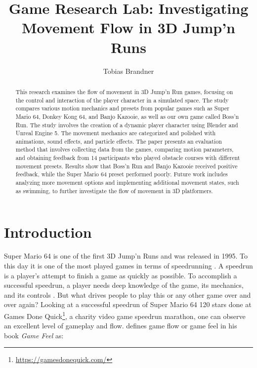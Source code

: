 \documentclass[letterpaper, 10 pt, conference]{ieeeconf}  %
\title{\LARGE \bf
Game Research Lab: Investigating Movement Flow in 3D Jump'n Runs
}
\author{Tobias Brandner}
\affil{Julius-Maximilians University \\
        Würzburg, Germany \\
        tobias.brandner@stud-mail.uni-wuerzburg.de}
\begin{document}
\maketitle
\thispagestyle{empty}
\pagestyle{empty}

\BiblatexSplitbibDefernumbersWarningOff

\begin{abstract}

    This research examines the flow of movement in 3D Jump'n Run games, focusing on the control and interaction of the player character in a simulated space. 
    The study compares various motion mechanics and presets from popular games such as Super Mario 64, Donkey Kong 64, and Banjo Kazooie, as well as our own game called Boss'n Run. 
    The study involves the creation of a dynamic player character using Blender and Unreal Engine 5. 
    The movement mechanics are categorized and polished with animations, sound effects, and particle effects. 
    The paper presents an evaluation method that involves collecting data from the games, comparing motion parameters, and obtaining feedback from 14 participants who played obstacle courses with different movement presets. 
    Results show that Boss'n Run and Banjo Kazooie received positive feedback, while the Super Mario 64 preset performed poorly. 
    Future work includes analyzing more movement options and implementing additional movement states, such as swimming, to further investigate the flow of movement in 3D platformers.
    
\end{abstract}


\section{Introduction}

Super Mario 64 \cite{SuperMario64} is one of the first 3D Jump'n Runs and was released in 1995.
To this day it is one of the most played games in terms of speedrunning \cite{SpeedrunDotCom}.
A speedrun is a player's attempt to finish a game as quickly as possible.
To accomplish a successful speedrun, a player needs deep knowledge of the game, its mechanics, and its controls \cite{speedrun}.
But what drives people to play this or any other game over and over again? 
Looking at a successful speedrun of Super Mario 64 120 stars \cite{Sm64Speed} done at Games Done Quick\footnote{\url{https://gamesdonequick.com/}}, a charity video game speedrun marathon, one can observe an excellent level of gameplay and flow. 
\citeauthor{swink2008game} defines game flow or game feel in his book \textit{Game Feel} as:
\end{document}
